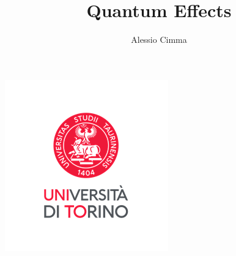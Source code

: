 \documentclass{article}
\title{Quantum Effects}
\author{Alessio Cimma}
\begin{document}
\maketitle

\begin{center}
	\includegraphics*[width=0.22\linewidth]{../images/logo.png}
\end{center}

\tableofcontents
\newpage

% 
% 
% 
% 
% 
% 
% 
% 
% 
% 
% 
% 
% 
% 
% 
% 
% 
% 

\end{document}
